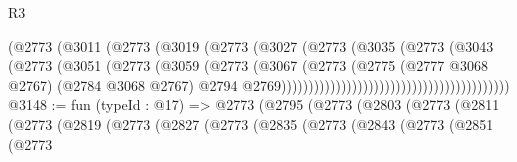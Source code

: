 \begin{lexlean}{R3}
\begin{coremodule}
                                                    (@2773
                                                      (@3011
                                                        (@2773
                                                          (@3019
                                                            (@2773
                                                              (@3027
                                                                (@2773
                                                                  (@3035
                                                                    (@2773
                                                                      (@3043
                                                                        (@2773
                                                                          (@3051
                                                                            (@2773
                                                                              (@3059
                                                                                (@2773
                                                                                  (@3067
                                                                                    (@2773
                                                                                      (@2775
                                                                                        (@2777
                                                                                          @3068
                                                                                          @2767)
                                                                                        (@2784
                                                                                          @3068
                                                                                          @2767)
                                                                                        @2794
                                                                                        @2769))))))))))))))))))))))))))))))))))))))))))
@3148 := fun (typeId : @17) =>
  @2773
    (@2795
      (@2773
        (@2803
          (@2773
            (@2811
              (@2773
                (@2819
                  (@2773
                    (@2827
                      (@2773
                        (@2835
                          (@2773
                            (@2843
                              (@2773
                                (@2851
                                  (@2773

\end{coremodule}
\end{lexlean}
